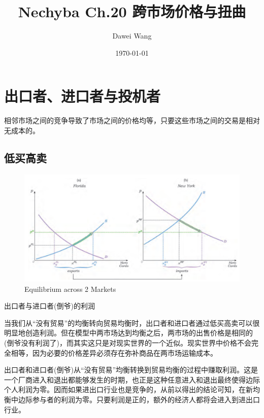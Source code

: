 \documentclass{article}
\title{Nechyba Ch.20 跨市场价格与扭曲}
\author{Dawei Wang}
\date{\today}
\begin{document}
	\maketitle
\section{出口者、进口者与投机者}

相邻市场之间的竞争导致了市场之间的价格均等，只要这些市场之间的交易是相对无成本的。

\subsection{低买高卖}

\begin{figure}[H] %
	\centering %
	\includegraphics[width=1\textwidth]{20_1} %
	\caption{Equilibrium across 2 Markets} %
	\label{Fig.main2} %
\end{figure}

\hspace*{\fill}

出口者与进口者(倒爷)的利润

当我们从“没有贸易”的均衡转向贸易均衡时，出口者和进口者通过低买高卖可以很明显地创造利润。但在模型中两市场达到均衡之后，两市场的出售价格是相同的(倒爷没有利润了)，而其实这只是对现实世界的一个近似。现实世界中价格不会完全相等，因为必要的价格差异必须存在弥补商品在两市场运输成本。

出口者和进口者(倒爷)从“没有贸易”均衡转换到贸易均衡的过程中赚取利润。这是一个厂商进入和退出都能够发生的时期，也正是这种任意进入和退出最终使得边际个人利润为零。因而如果进出口行业也是竞争的，从前以得出的结论可知，在新均衡中边际参与者的利润为零。只要利润是正的，额外的经济人都将会进入到进出口行业。
\end{document}
